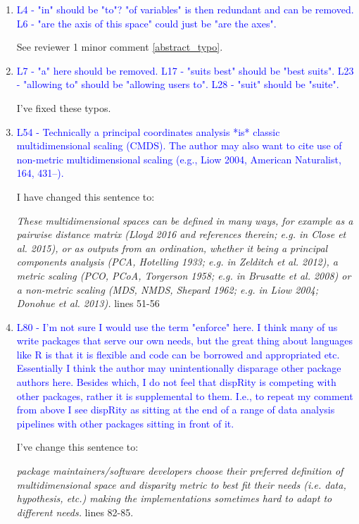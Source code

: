 \documentclass[12pt,letterpaper]{article}
\begin{document}
\begin{enumerate}

\item{\textcolor{blue}{L4 - "in" should be "to"? "of variables" is then redundant and can be removed. L6 - "are the axis of this space" could just be "are the axes".}}

See reviewer 1 minor comment \ref{abstract_typo}.

\item{\textcolor{blue}{L7 - "a" here should be removed. L17 - "suits best" should be "best suits". L23 - "allowing to" should be "allowing users to". L28 - "suit" should be "suite".}}

I've fixed these typos.

\item{\textcolor{blue}{L54 - Technically a principal coordinates analysis *is* classic multidimensional scaling (CMDS). The author may also want to cite use of non-metric multidimensional scaling (e.g., Liow 2004, American Naturalist, 164, 431–).}}
\label{PCO_cites}

I have changed this sentence to:

\textit{These multidimensional spaces can be defined in many ways, for example as a pairwise distance matrix (Lloyd 2016 and references therein; e.g. in Close et al. 2015), or as outputs from an ordination, whether it being a principal components analysis (PCA, Hotelling 1933; e.g. in Zelditch et al. 2012), a metric scaling (PCO, PCoA, Torgerson 1958; e.g. in Brusatte et al. 2008) or a non-metric scaling (MDS, NMDS, Shepard 1962; e.g. in Liow 2004; Donohue et al. 2013).} lines 51-56


\item{\textcolor{blue}{L80 - I'm not sure I would use the term "enforce" here. I think many of us write packages that serve our own needs, but the great thing about languages like R is that it is flexible and code can be borrowed and appropriated etc. Essentially I think the author may unintentionally disparage other package authors here. Besides which, I do not feel that dispRity is competing with other packages, rather it is supplemental to them. I.e., to repeat my comment from above I see dispRity as sitting at the end of a range of data analysis pipelines with other packages sitting in front of it.}}

I've change this sentence to:

\textit{package maintainers/software developers choose their preferred definition of multidimensional space and disparity metric to best fit their needs (i.e. data, hypothesis, etc.) making the implementations sometimes hard to adapt to different needs.} lines 82-85.


\end{enumerate}
\end{document}
